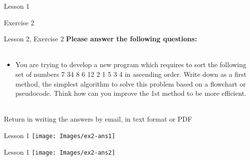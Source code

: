 \documentclass[aspectratio=1610]{beamer}
\begin{document}
\begin{frame}{Lesson 1}{}
\begin{center}
\Huge Exercise 2
\end{center}
\end{frame}

\begin{frame}{Lesson 2, Exercise 2}{}
\Large
\textbf{Please answer the following questions:}\\~\\ 

\Large{
\begin{itemize}
       \item You are trying to develop a new program which requires to sort the following set of numbers 7 34 8 6 12 2 1 5 3 4 in ascending order. Write down as a first method, the simplest algorithm to solve this problem based on a flowchart or pseudocode. Think how can you improve the 1st method to be more efficient.\\~\\
\end{itemize}}

Return in writing the answers by email, in text format or PDF
\end{frame}


\begin{frame}{Lesson 1}{}
\Large 
\texttt{[image: Images/ex2-ans1]}
\end{frame}


\begin{frame}{Lesson 1}{}
\Large 
\texttt{[image: Images/ex2-ans2]}
\end{frame}
\end{document}
